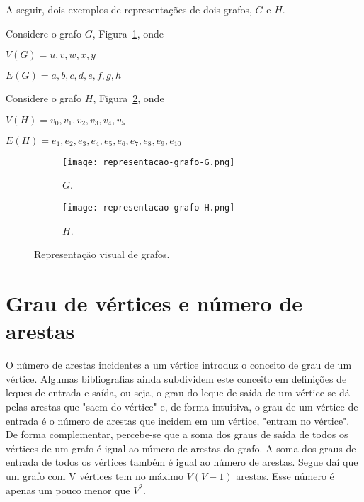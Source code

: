 A seguir, dois exemplos de representações de dois grafos, $G$ e $H$.

\begin{example}
    Considere o grafo $G$, Figura~\ref{sec2:ex-repr-grafo-G}, onde
    \begin{center}
        $V(G) = {u, v, w, x, y}$
    \end{center}
    \begin{center}
        $E(G) = {a, b, c, d, e, f, g, h}$
    \end{center}
\end{example}

\begin{example}
    Considere o grafo $H$, Figura~\ref{sec2:ex-repr-grafo-H}, onde
    \begin{center}
        $V(H) = {v_0, v_1, v_2, v_3, v_4, v_5}$
    \end{center}
    \begin{center}
        $E(H) = {e_1, e_2, e_3, e_4, e_5, e_6, e_7, e_8, e_9, e_10}$
    \end{center}
\end{example}

\begin{figure}[!htb]
    \centering
    \begin{subfigure}{.5\textwidth}
        \centering
        \texttt{[image: representacao-grafo-G.png]}
        \caption{$G$.}
        \label{sec2:ex-repr-grafo-G}
    \end{subfigure}%
    \begin{subfigure}{.5\textwidth}
        \centering
        \texttt{[image: representacao-grafo-H.png]}
        \caption{$H$.}
        \label{sec2:ex-repr-grafo-H}
    \end{subfigure}
    \caption{Representação visual de grafos.}
    \label{sec2:ex-repr-grafo-G-H}
\end{figure}


\section{Grau de vértices e número de arestas}
O número de arestas incidentes a um vértice introduz o conceito de grau de um vértice. Algumas bibliografias ainda subdividem este conceito em definições de leques de entrada e saída, ou seja, o grau do leque de saída de um vértice se dá pelas arestas que "saem do vértice" e, de forma intuitiva, o grau de um vértice de entrada é o número de arestas que incidem em um vértice, "entram no vértice". De forma complementar, percebe-se que a soma dos graus de saída de todos os vértices de um grafo é igual ao número de arestas do grafo. A soma dos graus de entrada de todos os vértices também é igual ao número de arestas. Segue daí que um grafo com V vértices tem no máximo \begin{math}V (V - 1)\end{math} arestas. Esse número é apenas um pouco menor que ${V}^2$.

